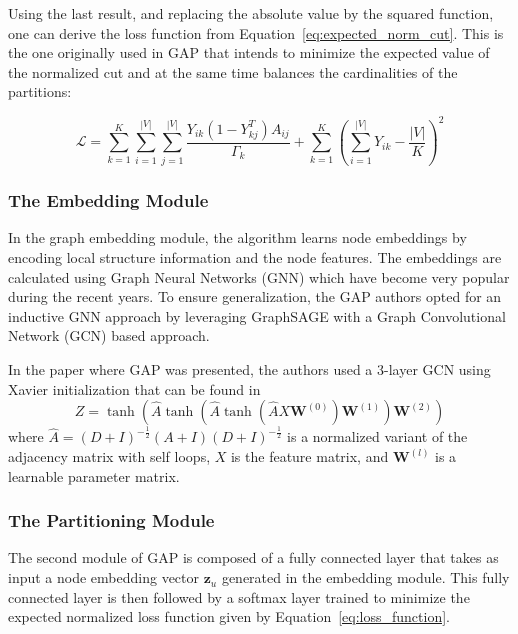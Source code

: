 Using the last result, and replacing the absolute value by the squared function, one can derive the loss function from Equation~\ref{eq:expected_norm_cut}. This is the one originally used in GAP that intends to minimize the expected value of the normalized cut and at the same time balances the cardinalities of the partitions:

\begin{equation}
    \label{eq:loss_function}
    \mathcal{L} = \sum_{k=1}^K\sum_{i=1}^{|V|}\sum_{j=1}^{|V|}\frac{Y_{ik}(1-Y_{kj}^T)A_{ij}}{\Gamma_k} + \sum_{k=1}^K\left(\sum_{i=1}^{|V|}Y_{ik} - \frac{|V|}{K}\right)^2
\end{equation}

\subsubsection{The Embedding Module} In the graph embedding module, the algorithm learns node embeddings by encoding local structure information and the node features. The embeddings are calculated using Graph Neural Networks (GNN) which have become very popular during the recent years. To ensure generalization, the GAP authors opted for an inductive GNN approach by leveraging GraphSAGE with a Graph Convolutional Network (GCN) based approach.

In the paper where GAP was presented, the authors used a $3$-layer GCN using Xavier initialization that can be found in~\cite{xavier}
\begin{displaymath}
    Z = \tanh(\hat{A}\tanh(\hat{A}\tanh(\hat{A}X\boldsymbol W^{(0)})\boldsymbol W^{(1)})\boldsymbol W^{(2)})
\end{displaymath}
where $\hat{A} = (D+I)^{-\frac{1}{2}}(A+I)(D+I)^{-\frac{1}{2}}$ is a normalized variant of the adjacency matrix with self loops, $X$ is the feature matrix, and $\boldsymbol W^{(l)}$ is a learnable parameter matrix.

\subsubsection{The Partitioning Module}
The second module of GAP is composed of a fully connected layer that takes as input a node embedding vector $\boldsymbol z_u$ generated in the embedding module. This fully connected layer is then followed by a softmax layer 
trained to minimize the expected normalized loss function given by Equation~\ref{eq:loss_function}.

